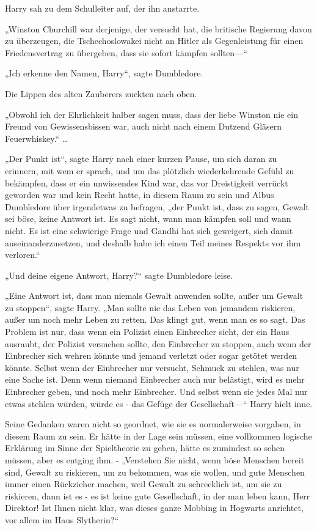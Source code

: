 {Harry sah zu dem Schulleiter auf, der ihn anstarrte.

„Winston Churchill war derjenige, der versucht hat, die britische Regierung davon zu überzeugen, die Tschechoslowakei nicht an Hitler als Gegenleistung für einen Friedensvertrag zu übergeben, dass sie sofort kämpfen sollten—“

„Ich erkenne den Namen, Harry“, sagte Dumbledore.

Die Lippen des alten Zauberers zuckten nach oben.

„Obwohl ich der Ehrlichkeit halber sagen muss, dass der liebe Winston nie ein Freund von Gewissensbissen war, auch nicht nach einem Dutzend Gläsern Feuerwhiskey.“ …

„Der Punkt ist“, sagte Harry nach einer kurzen Pause, um sich daran zu erinnern, mit wem er sprach, und um das plötzlich wiederkehrende Gefühl zu bekämpfen, dass er ein unwissendes Kind war, das vor Dreistigkeit verrückt geworden war und kein Recht hatte, in diesem Raum zu sein und Albus Dumbledore über irgendetwas zu befragen, „der Punkt ist, dass zu sagen, Gewalt sei böse, keine Antwort ist. Es sagt nicht, wann man kämpfen soll und wann nicht. Es ist eine schwierige Frage und Gandhi hat sich geweigert, sich damit auseinanderzusetzen, und deshalb habe ich einen Teil meines Respekts vor ihm verloren.“

„Und deine eigene Antwort, Harry?“ sagte Dumbledore leise.

„Eine Antwort ist, dass man niemals Gewalt anwenden sollte, außer um Gewalt zu stoppen“, sagte Harry. „Man sollte nie das Leben von jemandem riskieren, außer um noch mehr Leben zu retten. Das klingt gut, wenn man es so sagt. Das Problem ist nur, dass wenn ein Polizist einen Einbrecher sieht, der ein Haus ausraubt, der Polizist versuchen sollte, den Einbrecher zu stoppen, auch wenn der Einbrecher sich wehren könnte und jemand verletzt oder sogar getötet werden könnte. Selbst wenn der Einbrecher nur versucht, Schmuck zu stehlen, was nur eine Sache ist. Denn wenn niemand Einbrecher auch nur belästigt, wird es mehr Einbrecher geben, und noch mehr Einbrecher. Und selbst wenn sie jedes Mal nur etwas stehlen würden, würde es - das Gefüge der Gesellschaft—“ Harry hielt inne.

Seine Gedanken waren nicht so geordnet, wie sie es normalerweise vorgaben, in diesem Raum zu sein. Er hätte in der Lage sein müssen, eine vollkommen logische Erklärung im Sinne der Spieltheorie zu geben, hätte es zumindest so sehen müssen, aber es entging ihm. - „Verstehen Sie nicht, wenn böse Menschen bereit sind, Gewalt zu riskieren, um zu bekommen, was sie wollen, und gute Menschen immer einen Rückzieher machen, weil Gewalt zu schrecklich ist, um sie zu riskieren, dann ist es - es ist keine gute Gesellschaft, in der man leben kann, Herr Direktor! Ist Ihnen nicht klar, was dieses ganze Mobbing in Hogwarts anrichtet, vor allem im Haus Slytherin?“

}
